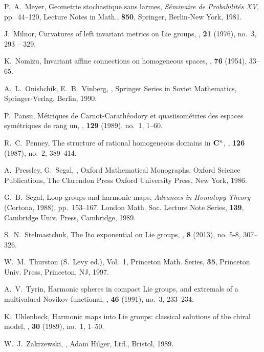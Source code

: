\documentclass[12pt]{amsart}
\theoremstyle{definition}
\theoremstyle{remark}
\numberwithin{equation}{section}
\begin{document}
\begin{thebibliography}{10}
 P.~A.~Meyer, 
 \newblock Geometrie stochastique sans larmes, 
 \textit{S{\'e}minaire de Probabilit{\'e}s XV}, 
 pp.~44--120, \newblock Lecture Notes in Math., \textbf{850}, 
 Springer, Berlin-New York,  1981.

 J.~Milnor, 
 \newblock Curvatures of left invariant metrics on Lie groups, 
 , \textbf{21} (1976), no.~3, 293 -- 329.

 K.~Nomizu, 
 \newblock Invariant affine connections on homogeneous spaces,
 , \textbf{76} (1954), 33--65.

 A.~L.~Onishchik, E.~B.~Vinberg, 
 , 
 \newblock Springer Series in Soviet Mathematics, 
 Springer-Verlag, Berlin, 1990.

 P.~Pansu, 
 \newblock M\'etriques de {C}arnot-{C}arath\'eodory et quasiisom\'etries
              des espaces sym\'etriques de rang un,
 , \textbf{129} (1989), no.~1, 1--60.

 R.~C.~Penney,
 \newblock The structure of rational homogeneous domains in {${\bf C}^n$},
 , \textbf{126} (1987), no.~2, 389--414.

 A.~Pressley, G.~Segal,
 ,
 \newblock Oxford Mathematical Monographs, Oxford Science Publications,
 The Clarendon Press Oxford University Press, New York, 1986.

 G.~B.~Segal,
 \newblock Loop groups and harmonic maps, 
 {\em Advances in Homotopy Theory} (Cortona, 1988),
 pp.~153--167, 
 \newblock London Math. Soc. Lecture Note Series, \textbf{139}, 
 Cambridge Univ. Press, Cambridge, 1989.

 S.~N.~Stelmastchuk, 
 \newblock The Ito exponential on Lie groups,
 , \textbf{8} (2013), no. 5-8, 307--326. 

 W.~M.~Thurston (S.~Levy ed.),
  Vol.~1,
 \newblock Princeton Math. Series, \textbf{35}, 
 Princeton Univ. Press, Princeton, NJ, 1997.

 A.~V.~Tyrin, 
 \newblock Harmonic spheres in compact Lie groups, and extremals of a multivalued 
 Novikov functional,
 , \textbf{46} (1991), no.~3, 233--234. 

 K.~Uhlenbeck,
 \newblock Harmonic maps into Lie groups: classical  solutions of the chiral model, 
 , \textbf{30} (1989), no.~1, 1--50. 

 W.~J.~Zakrzewski,
 ,
 \newblock Adam Hilger, Ltd., Bristol, 1989.
\end{thebibliography}
\end{document}
